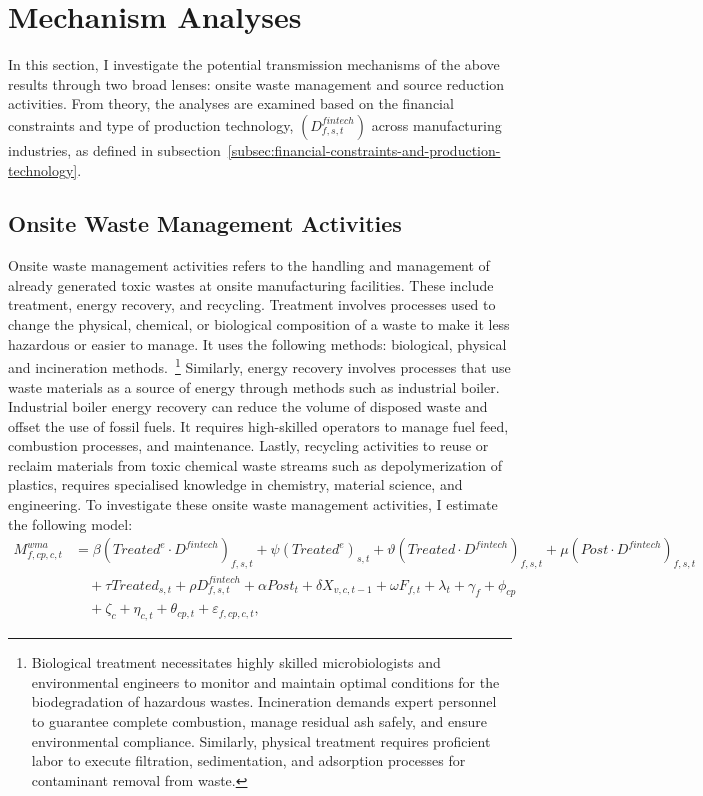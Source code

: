 \documentclass[12pt, english]{article}
\begin{document}
    \section{Mechanism Analyses}\label{sec:mechanism-analyses}
    In this section, I investigate the potential transmission mechanisms of the above results through two broad lenses: onsite waste management and source reduction activities. From theory, the analyses are examined based on the financial constraints and type of production technology, $(D^{fintech}_{f,s,t})$ across manufacturing industries, as defined in subsection~\ref{subsec:financial-constraints-and-production-technology}.

    \subsection{Onsite Waste Management Activities}\label{subsec:onsite-waste-management-activities}
    Onsite waste management activities refers to the handling and management of already generated toxic wastes at onsite manufacturing facilities. These include treatment, energy recovery, and recycling. Treatment involves processes used to change the physical, chemical, or biological composition of a waste to make it less hazardous or easier to manage. It uses the following methods: biological, physical and incineration methods.~\footnote{\tiny Biological treatment necessitates highly skilled microbiologists and environmental engineers to monitor and maintain optimal conditions for the biodegradation of hazardous wastes. Incineration demands expert personnel to guarantee complete combustion, manage residual ash safely, and ensure environmental compliance. Similarly, physical treatment requires proficient labor to execute filtration, sedimentation, and adsorption processes for contaminant removal from waste.} Similarly, energy recovery involves processes that use waste materials as a source of energy through methods such as industrial boiler. Industrial boiler energy recovery can reduce the volume of disposed waste and offset the use of fossil fuels. It requires high-skilled operators to manage fuel feed, combustion processes, and maintenance. Lastly, recycling activities to reuse or reclaim materials from toxic chemical waste streams such as depolymerization of plastics, requires specialised knowledge in chemistry, material science, and engineering. To investigate these onsite waste management activities, I estimate the following model:
    \begin{align}
        M_{f,cp,c,t}^{wma} &= \beta (Treated^{e} \cdot D^{fintech})_{f,s,t} + \psi (Treated^{e})_{s,t} + \vartheta (Treated \cdot D^{fintech})_{f,s,t} + \mu (Post \cdot D^{fintech})_{f,s,t} \nonumber \\
        &\quad + \tau Treated_{s,t} + \rho D_{f,s,t}^{fintech} + \alpha Post_{t} + \delta X_{v,c,t-1} + \omega F_{f,t} + \lambda_{t} + \gamma_{f} + \phi_{cp} \nonumber \\
        &\quad + \zeta_{c} + \eta_{c,t} + \theta_{cp,t} + \varepsilon_{f,cp,c,t},\label{eq:mechanisms-waste-management}
    \end{align}
\end{document}
